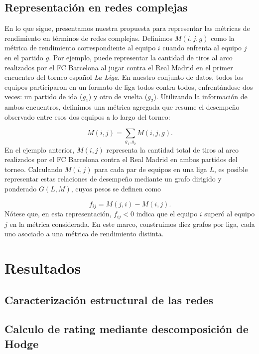 \documentclass[]{article}
\begin{document}
\subsection{Representación en redes complejas}

En lo que sigue, presentamos nuestra propuesta para representar las métricas de rendimiento en términos de redes complejas.
Definimos $M(i, j, g)$ como la métrica de rendimiento correspondiente al equipo $i$ cuando enfrenta al equipo $j$ en el partido $g$. Por ejemplo, puede representar la cantidad de tiros al arco realizados por el FC Barcelona al jugar contra el Real Madrid en el primer encuentro del torneo español {\it La Liga}.
%
En nuestro conjunto de datos, todos los equipos participaron en un formato de liga todos contra todos, enfrentándose dos veces: un partido de ida ($g_1$) y otro de vuelta ($g_2$). Utilizando la información de ambos encuentros, definimos una métrica agregada que resume el desempeño observado entre esos dos equipos a lo largo del torneo:

$$
M(i,j) = \sum_{g_1, g_2} M(i,j,g).
$$
%
En el ejemplo anterior, $M(i,j)$ representa la cantidad total de tiros al arco realizados por el FC Barcelona contra el Real Madrid en ambos partidos del torneo.
%
Calculando $M(i,j)$ para cada par de equipos en una liga $L$, es posible representar estas relaciones de desempeño mediante un grafo dirigido y ponderado $G(L,M)$, cuyos pesos se definen como

$$
f_{ij} = M(j,i) - M(i,j).
$$
%
Nótese que, en esta representación, $f_{ij} < 0$ indica que el equipo $i$ superó al equipo $j$ en la métrica considerada.
%
En este marco, construimos diez grafos por liga, cada uno asociado a una métrica de rendimiento distinta.












\section{Resultados}

\subsection{Caracterización estructural de las redes}


\subsection{Calculo de rating mediante descomposición de Hodge }
\end{document}
